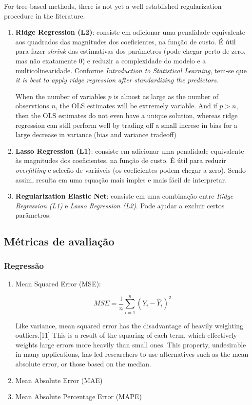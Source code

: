 For tree-based methods, there is not yet a well established regularization procedure in the literature.

\begin{enumerate}
\item \textbf{Ridge Regression (L2)}: consiste em adicionar uma penalidade equivalente aos quadrados das magnitudes dos coeficientes, na função de custo. É útil para fazer \textit{shrink} das estimativas dos parâmetros (pode chegar perto de zero, mas não exatamente 0) e reduzir a complexidade do modelo e a multicolinearidade. Conforme \textit{Introduction to Statistical Learning}, tem-se que \textit{it is best to apply ridge regression after standardizing the predictors}.

When the number of variables $p$ is almost as large as the number of observtions $n$, the OLS estimates will be extremely variable. And if $p > n$, then the OLS estimates do not even have a unique solution, whereas ridge regression can still perform well by trading off a small increse in bias for a large decrease in variance (bias and variance tradeoff)

\item \textbf{Lasso  Regression (L1)}: consiste em adicionar uma penalidade equivalente às magnitudes dos coeficientes, na função de custo. É útil para reduzir \textit{overfitting} e selecão de variáveis (os coeficientes podem chegar a zero). Sendo assim, resulta em uma equação mais imples e mais fácil de interpretar.

\item \textbf{Regularization Elastic Net}: consiste em uma combinação entre \textit{Ridge Regression (L1)} e \textit{Lasso Regression (L2)}. Pode ajudar a excluir certos parâmetros.
\end{enumerate}

\subsection{Métricas de avaliação}
\subsubsection{Regressão}

\begin{enumerate}
    \item Mean Squared Error (MSE):
    
    \begin{equation}
        MSE = \frac{1}{n}\sum^n_{i=1}(Y_i - \hat{Y}_i)^2
    \end{equation}
    
    Like variance, mean squared error has the disadvantage of heavily weighting outliers.[11] This is a result of the squaring of each term, which effectively weights large errors more heavily than small ones. This property, undesirable in many applications, has led researchers to use alternatives such as the mean absolute error, or those based on the median. 
    \item Mean Absolute Error (MAE)
    \item Mean Absolute Percentage Error (MAPE)
\end{enumerate}

